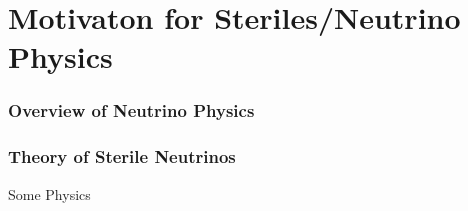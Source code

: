 \chapter{Motivaton for Steriles/Neutrino Physics}
\label{chap:Neutrino Physics}
\subsection{Overview of Neutrino Physics}
\subsection{Theory of Sterile Neutrinos}
Some Physics